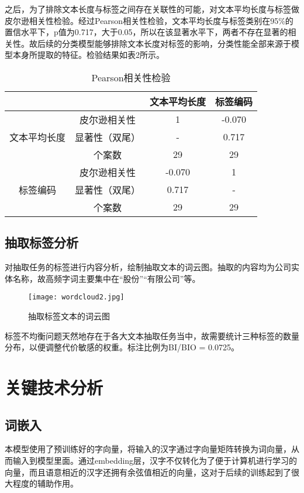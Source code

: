 \documentclass[letterpaper]{article}
\begin{document}
  之后，为了排除文本长度与标签之间存在关联性的可能，对文本平均长度与标签做皮尔逊相关性检验。经过Pearson相关性检验，文本平均长度与标签类别在95\%的置信水平下，p值为0.717，大于0.05，所以在该显著水平下，两者不存在显著的相关性。故后续的分类模型能够排除文本长度对标签的影响，分类性能全部来源于模型本身所提取的特征。检验结果如表2所示。
  \begin{table}[htbp]
    \centering
    \caption{Pearson相关性检验}
    \begin{tabular}{c|c|cc}
    \toprule[2pt]
    \multicolumn{2}{c|}{}             & 文本平均长度 & 标签编码   \\ \hline
    \multirow{3}{*}{文本平均长度} & 皮尔逊相关性  & 1      & -0.070 \\
                            & 显著性（双尾） & -      & 0.717  \\
                            & 个案数     & 29     & 29     \\ \hline
    \multirow{3}{*}{标签编码}   & 皮尔逊相关性  & -0.070 & 1      \\
                            & 显著性（双尾） & 0.717  & -      \\
                            & 个案数     & 29     & 29     \\
    \toprule[2pt]
    \end{tabular}
  \end{table}

  \subsection{抽取标签分析}
  对抽取任务的标签进行内容分析，绘制抽取文本的词云图。抽取的内容均为公司实体名称，故高频字词主要集中在“股份”“有限公司”等。

  \begin{figure}[h]
    \centering
    \texttt{[image: wordcloud2.jpg]}
    \caption{抽取标签文本的词云图}
  \end{figure}

  标签不均衡问题天然地存在于各大文本抽取任务当中，故需要统计三种标签的数量分布，以便调整代价敏感的权重。标注比例为BI/BIO = 0.0725。

\section{关键技术分析}
  \subsection{词嵌入}
  本模型使用了预训练好的字向量，将输入的汉字通过字向量矩阵转换为词向量，从而输入到模型里面。通过embedding层，汉字不仅转化为了便于计算机进行学习的向量，而且语意相近的汉字还拥有余弦值相近的向量，这对于后续的训练起到了很大程度的辅助作用。
\end{document}
